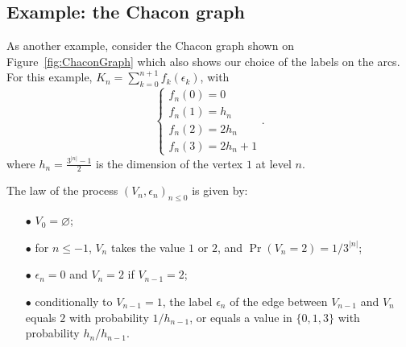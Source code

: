 \documentclass[12pt,a4paper]{article}
\begin{document}
\subsection{Example: the Chacon graph}\label{sec:chacongraph}

As another example, consider the Chacon graph shown on Figure~\ref{fig:ChaconGraph} 
which also shows our choice of the labels on the arcs. 
For this example, 
$K_n=\sum_{k=0}^{n+1}f_k(\epsilon_k)$, with  
$$
\begin{cases}
f_n(0) = 0 \\ 
f_n(1) = h_{n} \\ 
f_n(2) = 2h_{n} \\
f_n(3) = 2 h_{n} + 1
\end{cases}.
$$
where $h_n=\frac{3^{|n|}-1}{2}$ is the dimension of the vertex $1$ at level $n$. 


The law of the process ${(V_n, \epsilon_n)}_{n \leq 0}$ is given by:

\begin{itemize}
\item[$\bullet$] $V_0=\varnothing$; 

\item[$\bullet$] for $n \leq -1$, $V_n$ takes the value $1$ or $2$, and 
 $\Pr(V_n = 2) = 1/3^{|n|}$;

\item[$\bullet$] $\epsilon_n=0$ and $V_n=2$ if $V_{n-1}=2$;

\item[$\bullet$] conditionally to $V_{n-1}=1$, the label $\epsilon_n$ 
of the edge between $V_{n-1}$ and $V_n$ equals 
 $2$ with probability $1/h_{n-1}$, or equals a value in 
$\{0,1,3\}$ with probability $h_{n}/h_{n-1}$. 
\end{itemize}


%
\end{document}
